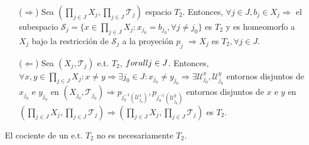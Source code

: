 \begin{dem}
  \begin{enumerate}[label=(\roman*)]
    \item [($\Rightarrow$)] Sea $( \prod_{j \in J} X_{j}, \prod_{j \in J} \mathcal{T}_{j} )$ espacio $T_{2}$. Entonces, $\forall j \in J, b_{j} \in X_{j} \Rightarrow $ el subespacio $ \mathcal{S}_{j} = \{ x \in \prod_{j \in J} X_{j} : x_{j_{0}} = b_{j_{0}}, \forall j \neq j_{0} \}$ es $T_{2}$ y es homeomorfo a $X_{j}$ bajo la restricción de $\mathcal{S}_{j} $ a la proyeción $p_{j}$ $ \Rightarrow X_{j}$ es $T_{2}, \forall j \in J$.
    \item [($\Leftarrow$)] Sea $( X_{j}, \mathcal{T}_{j} )$ e.t. $T_{2}$, $\\forall j \in J$. Entonces, $\forall x,y \in \prod_{j \in J} X_{j} : x \neq y \Rightarrow \exists j_{0} \in J : x_{j_{0}} \neq y_{j_{0}} \Rightarrow \exists \mathcal{U}^{x}_{j_{0}}, \mathcal{U}^{y}_{j_{0}}$ entornos disjuntos de $x_{j_{0}}$ e $y_{j_{0}}$ en $( X_{j_{0}}, \mathcal{T}_{j_{0}} ) \Rightarrow p_{j_{0}^{-1}(\mathcal{U}^{x}_{j_{0}})}, p_{j_{0}^{-1}(\mathcal{U}^{y}_{j_{0}})}$ entornos disjuntos de $x$ e $y$ en $( \prod_{j \in J} X_{j}, \prod_{j \in J} \mathcal{T}_{j} ) \Rightarrow ( \prod_{j \in J} X_{j}, \prod_{j \in J} \mathcal{T}_{j} )$ es $T_{2}$.
  \end{enumerate}
\end{dem}

\begin{obs}
  El cociente de un e.t. $T_{2}$ no es necesariamente $T_{2}$.
\end{obs}
